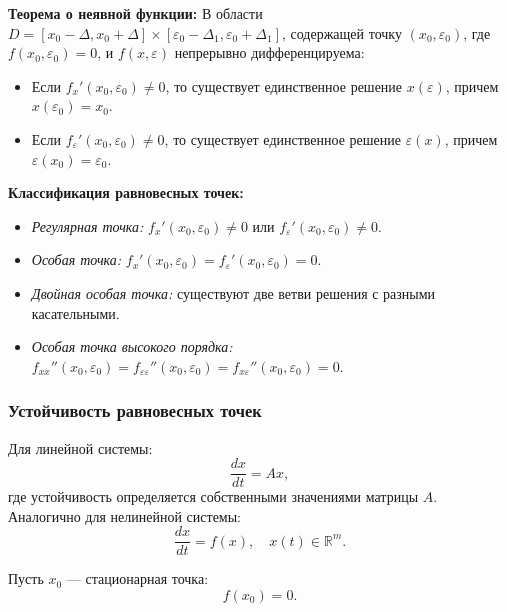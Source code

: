 	\textbf{Теорема о неявной функции:}  
	В области \( D = [x_0 - \Delta, x_0 + \Delta] \times [\varepsilon_0 - \Delta_1, \varepsilon_0 + \Delta_1] \), содержащей точку \((x_0, \varepsilon_0)\), где \( f(x_0, \varepsilon_0) = 0 \), и \( f(x, \varepsilon) \) непрерывно дифференцируема:
	\begin{itemize}
		\item Если \( f_x'(x_0, \varepsilon_0) \neq 0 \), то существует единственное решение \( x(\varepsilon) \), причем \( x(\varepsilon_0) = x_0 \).
		\item Если \( f_\varepsilon'(x_0, \varepsilon_0) \neq 0 \), то существует единственное решение \(\varepsilon(x)\), причем \(\varepsilon(x_0) = \varepsilon_0\).
	\end{itemize}
	
	\textbf{Классификация равновесных точек:}
	\begin{itemize}
		\item \textit{Регулярная точка:} \( f_x'(x_0, \varepsilon_0) \neq 0 \) или \( f_\varepsilon'(x_0, \varepsilon_0) \neq 0 \).
		\item \textit{Особая точка:} \( f_x'(x_0, \varepsilon_0) = f_\varepsilon'(x_0, \varepsilon_0) = 0 \).
		\item \textit{Двойная особая точка:} существуют две ветви решения с разными касательными.
		\item \textit{Особая точка высокого порядка:} \( f_{xx}''(x_0, \varepsilon_0) = f_{\varepsilon\varepsilon}''(x_0, \varepsilon_0) = f_{x\varepsilon}''(x_0, \varepsilon_0) = 0 \).
	\end{itemize}
	
	\subsubsection{Устойчивость равновесных точек}
	
	Для линейной системы:
	\begin{equation}
		\frac{d x}{d t} = A x,
	\end{equation}
	где устойчивость определяется собственными значениями матрицы \(A\). 
	\newline
	Аналогично для нелинейной системы:
	\begin{equation}
		\frac{d x}{d t} = f(x), \quad x(t) \in \mathbb{R}^m.
	\end{equation}
	
	Пусть \(x_0\) — стационарная точка:
	\begin{equation}
		f(x_0) = 0.
	\end{equation}
	
